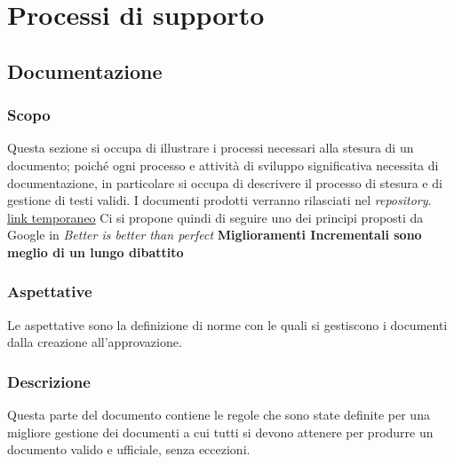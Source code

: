 \section{Processi di supporto}
  \subsection{Documentazione}

  \subsubsection{Scopo}
  Questa sezione si occupa di illustrare i processi necessari alla stesura di un
  documento; poiché ogni processo e attivit\`a di sviluppo significativa necessita
  di documentazione, in particolare si occupa di descrivere il processo di stesura e
  di gestione di testi validi.
  I documenti prodotti verranno rilasciati nel \textit{repository}\glo.
  \href{https://GitHub.com/Jatus93/sweDocs}{link temporaneo}
  Ci si propone quindi di seguire uno dei principi proposti da Google in
  \textit{Better is better than perfect}
  \textbf{Miglioramenti Incrementali sono meglio di un lungo dibattito}

  \subsubsection{Aspettative}
  Le aspettative sono la definizione di norme con le quali
  si gestiscono i documenti dalla creazione all'approvazione.

  \subsubsection{Descrizione}
  Questa parte del documento contiene le regole che sono state definite per una
  migliore gestione dei documenti a cui tutti si devono attenere per produrre un
  documento valido e ufficiale, senza eccezioni.

